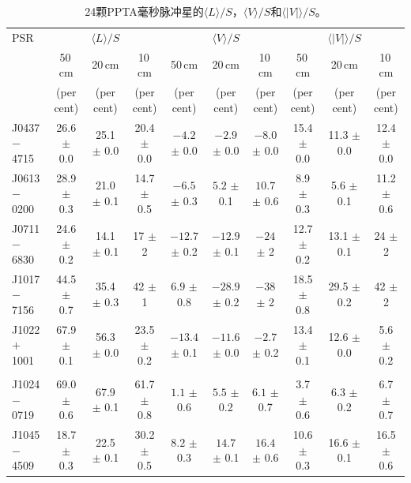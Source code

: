 %
\begin{landscape}
\begin{table}
\small
\begin{center}
\caption{24颗PPTA毫秒脉冲星的$\langle L \rangle/S$，$\langle V \rangle/S$和$\langle|V|\rangle/S$。}
\label{tablePol}
\begin{tabular}{lccccccccc}
\hline
PSR              &                  &    $\langle L \rangle/S$    &                  &               & $\langle V \rangle/S$       &                  &      &      $\langle|V|\rangle/S$       &                      \\
								 &    50\,cm      &   20\,cm       &    10\,cm &    50\,cm      &   20\,cm       &    10\,cm &    50\,cm      &   20\,cm       &    10\,cm              \\
								 &     (per cent)   &         (per cent)          &     (per cent)   &    (per cent)   &         (per cent)          &     (per cent)   &   (per cent)   &         (per cent)          &     (per cent)  \\
\hline
J0437$-$4715& 26.6 $\pm$ 0.0& 25.1 $\pm $ 0.0& 20.4 $\pm$ 0.0&$ -4.2$ $\pm$ 0.0 &$ -2.9$ $\pm$ 0.0 &$ -8.0$ $\pm$ 0.0 & 15.4 $\pm$ 0.0 & 11.3 $\pm$ 0.0 & 12.4 $\pm$ 0.0 \\
J0613$-$0200& 28.9 $\pm$ 0.3& 21.0 $\pm $ 0.1& 14.7 $\pm$ 0.5&$ -6.5$ $\pm$ 0.3 &$ 5.2 $ $\pm$ 0.1 &$ 10.7$ $\pm$ 0.6 &  8.9 $\pm$ 0.3 &  5.6 $\pm$ 0.1 & 11.2 $\pm$ 0.6 \\
J0711$-$6830& 24.6 $\pm$ 0.2& 14.1 $\pm $ 0.1& 17   $\pm$ 2  &$-12.7$ $\pm$ 0.2 &$-12.9$ $\pm$ 0.1 &$ -24 $ $\pm$ 2   & 12.7 $\pm$ 0.2 & 13.1 $\pm$ 0.1 & 24   $\pm$ 2 \\
J1017$-$7156& 44.5 $\pm$ 0.7& 35.4 $\pm $ 0.3& 42   $\pm$ 1  &$  6.9$ $\pm$ 0.8 &$-28.9$ $\pm$ 0.2 &$ -38 $ $\pm$ 2   & 18.5 $\pm$ 0.8 & 29.5 $\pm$ 0.2 & 42   $\pm$ 2 \\
J1022$+$1001& 67.9 $\pm$ 0.1& 56.3 $\pm $ 0.0& 23.5 $\pm$ 0.2&$-13.4$ $\pm$ 0.1 &$-11.6$ $\pm$ 0.0 &$ -2.7$ $\pm$ 0.2 & 13.4 $\pm$ 0.1 & 12.6 $\pm$ 0.0 & 5.6  $\pm$ 0.2 \\
            &               &                &               &                &                &                &                &                &                \\
J1024$-$0719& 69.0 $\pm$ 0.6& 67.9 $\pm $ 0.1& 61.7 $\pm$ 0.8&$ 1.1 $ $\pm$ 0.6 &$  5.5$ $\pm$ 0.2 &$ 6.1 $ $\pm$ 0.7 &  3.7 $\pm$ 0.6 &  6.3 $\pm$ 0.2 & 6.7  $\pm$ 0.7 \\
J1045$-$4509& 18.7 $\pm$ 0.3& 22.5 $\pm $ 0.1& 30.2 $\pm$ 0.5&$ 8.2 $ $\pm$ 0.3 &$ 14.7$ $\pm$ 0.1 &$ 16.4$ $\pm$ 0.6 & 10.6 $\pm$ 0.3 & 16.6 $\pm$ 0.1 & 16.5 $\pm$ 0.6 \\

\end{tabular}
\end{center}
\end{table}
\end{landscape}
